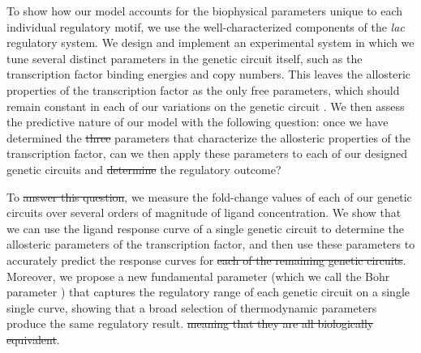 To show how our model accounts for the biophysical parameters unique to each
individual regulatory motif, we use the well-characterized components of the
\textit{lac} regulatory system. We design and implement an experimental system
in which we tune several distinct parameters in the genetic circuit itself,
such as the transcription factor binding energies and copy numbers. This leaves
the allosteric properties of the transcription factor as the only free
parameters, which should remain constant in each of our variations on the
genetic circuit . We then assess the predictive nature of our
model with the following question: once we have determined the \sout{three} parameters
 that characterize the allosteric properties of the transcription
factor, can we then apply these parameters to each of our designed genetic
circuits and \sout{determine} the regulatory outcome?


To \sout{answer this question}, we
measure the fold-change values of each of our genetic circuits over several
orders of magnitude of ligand concentration. We show that we can use the ligand
response curve of a single genetic circuit to determine the allosteric
parameters of the transcription factor, and then use these parameters to
accurately predict the response curves for \sout{each of the remaining genetic
circuits}. Moreover, we propose a new fundamental parameter (which we call
the Bohr parameter ) that captures the regulatory range of each genetic circuit on a
single single curve, showing that a broad selection of thermodynamic parameters
produce the same regulatory result. \sout{meaning that they are all
biologically equivalent}. 



